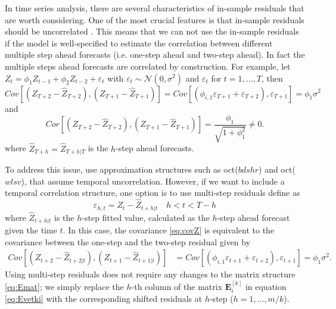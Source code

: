 \documentclass[a4paper,11pt]{article}
\newcommand{\Evet}{\bm{E}}
\theoremstyle{definition}
\begin{document}
In time series analysis, there are several characteristics of in-sample residuals that are worth considering. One of the most crucial features is that in-sample residuals should be uncorrelated \citep{tsay2014,hyndman2021}. %
This means that we can not use the in-sample residuals if the model is well-specified to estimate the correlation between different multiple step ahead forecasts (i.e. one-step ahead and two-step ahead). In fact the multiple steps ahead forecasts are correlated by construction. For example, let $Z_t = \phi_1 Z_{t-1} + \phi_2 Z_{t-2} + \varepsilon_t$ with $\varepsilon_t\sim \mathcal{N}(0, \sigma^2)$ and $\varepsilon_t$ for $t = 1,\dots,T$, then
\begin{equation}\label{eq:covZ}
	Cov\left[\left(Z_{T+2}-\widehat{Z}_{T+2}\right), \left(Z_{T+1}-\widehat{Z}_{T+1}\right)\right] = Cov\left[\left(\phi_{i, 1}\varepsilon_{T+1} + \varepsilon_{T+2}\right), \varepsilon_{T+1}\right] = \phi_{1}\sigma^2
\end{equation}
and
$$
	Cor\left[\left(Z_{T+2}-\widehat{Z}_{T+2}\right), \left(Z_{T+1}-\widehat{Z}_{T+1}\right)\right] = \frac{\phi_{1}}{\sqrt{1+\phi_1^2}} \neq 0.
$$
where $\widehat{Z}_{T+h} = \widehat{Z}_{T+h|T}$ is the $h$-step ahead forecasts.

To address this issue, \cite{difonzo2023} use approximation structures such as oct($bdshr$) and oct($wlsv$), that assume temporal uncorrelation. However, if we want to include a temporal correlation structure, one option is to use multi-step residuals define as
$$
	\varepsilon_{h,t} = Z_t - \widehat{Z}_{t+h|t}\quad h<t<T-h
$$
where $\widehat{Z}_{t+h|t}$ is the $h$-step fitted value, calculated as the $h$-step ahead forecast given the time $t$. In this case, the covariance \eqref{eq:covZ} is equivalent to the covariance between the one-step and the two-step residual given by
\begin{equation*}
	\begin{aligned}
		Cov\left[\left(Z_{t+2}-\widehat{Z}_{t+2|t}\right), \left(Z_{t+1}-\widehat{Z}_{t+1|t}\right)\right] & = Cov\left[\left(\phi_{i, 1}\varepsilon_{t+1} + \varepsilon_{t+2}\right), \varepsilon_{t+1}\right] = \phi_{1}\sigma^2.
	\end{aligned}
\end{equation*}
Using multi-step residuals does not require any changes to the matrix structure \eqref{eq:Emat}; we simply replace the $h$-th column of the matrix $\Evet_i^{[k]}$ in equation \eqref{eq:Evetki} with the corresponding shifted residuals at $h$-step ($h = 1, \dots, m/k$).
\end{document}
